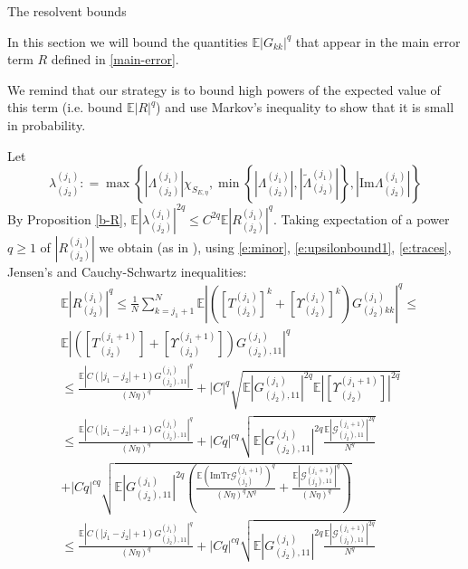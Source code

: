\documentclass[11pt, a4paper, oneside]{book}
\numberwithin{equation}{chapter}
\newcommand{\E}{\mathbb E}
\newcommand{\Tr}{\mathrm{Tr}}
\begin{document}
\begin{section}{The resolvent bounds} \label{RBounds}

In this section we will bound the quantities $\mathbb{E} | G_{kk}|^q $ that appear in the main error term $R$ defined in \eqref{main-error}.

We remind that our strategy is to bound high powers of the expected value of this term (i.e. bound $\mathbb{E}|R|^q $) and use Markov's inequality to show that it is small in probability.

Let
%
\begin{equation}\label{d:lambda}
\lambda^{(j_1)}_{(j_2)} : = \max \left \{ \left |\Lambda^{(j_1)}_{(j_2)} \right |\chi_{S_{E,\eta}}, \min \left \{ \left |\Lambda^{(j_1)}_{(j_2)} \right |, \left |\tilde \Lambda^{(j_1)}_{(j_2)} \right | \right \}, \left | \mathrm{Im} \Lambda^{(j_1)}_{(j_2)} \right | \right \}
\end{equation}
%
By Proposition \ref{b-R},
$
\E \left | \lambda^{(j_1)}_{(j_2)} \right |^{2q} \leq C^{2q} \E \left | R^{(j_1)}_{(j_2)} \right |^q.
$
Taking expectation of a power $q\geq 1$ of $\left | R^{(j_1)}_{(j_2)} \right |$ we obtain (as in \cite{cacciapuoti2015bounds}), using \eqref{e:minor}, \eqref{e:upsilonbound1}, \eqref{e:traces}, Jensen's and Cauchy-Schwartz inequalities:
%
\begin{align*}\label{e:calc}
&\E \left | R^{(j_1)}_{(j_2)} \right |^q \leq
 \frac{1}{N} \sum_{k= j_1 +1}^N \E \left |\left ( [{T}_{(j_2)}^{(j_1)}]^k
  + [ \Upsilon^{(j_1)}_{(j_2)} ]^k \right)G^{(j_1)}_{(j_2) kk} \right|^q \leq
  \\
&\E\left|\left( [T_{(j_2)}^{(j_1+1)}]
  + [\Upsilon^{(j_1+1)}_{(j_2)}] \right) G^{(j_1)}_{(j_2), 11}\right|^q
  \\
&\leq \frac{\E \left |C (|j_1- j_2|+1) G^{(j_1)}_{(j_2),11}\right|^q}{(N\eta)^q} + \left|C \right|^q\sqrt{\E|G^{(j_1)}_{(j_2), 11}|^{2q}\E\left|
  [\Upsilon^{(j_1+1)}_{(j_2)}] \right|^{2q}}
  \\
&\leq \frac{\E \left |C (|j_1- j_2|+1) G^{(j_1)}_{(j_2),11}\right|^q}{(N\eta)^q} + \left|Cq\right|^{cq}\sqrt{ \E|G^{(j_1)}_{(j_2),11}|^{2q}\frac{\E|\mathcal{G}^{(j_1+1)}_{(j_2),11}|^{2q}}{N^q}}
\\
&+
 \left|C q\right|^{cq}\sqrt{\E|G^{(j_1)}_{(j_2),11}|^{2q}   \left(   \frac{\E ( \mathrm{Im} \Tr \mathcal{G}^{(j_1+1)}_{(j_2)})^q}{(N\eta)^qN^q} +  \frac{\E|\mathcal{G}^{(j_1+1)}_{(j_2),11}|^{q}}{(N\eta)^q}      \right)}
\\
&\leq \frac{\E \left |C (|j_1- j_2|+1) G^{(j_1)}_{(j_2),11}\right|^q}{(N\eta)^q} + \left|C q\right|^{cq} \sqrt{ \E|G^{(j_1)}_{(j_2),11}|^{2q}\frac{\E|\mathcal{G}^{(j_1+1)}_{(j_2),11}|^{2q}}{N^q}}

\end{align*}
\end{section}
\end{document}
